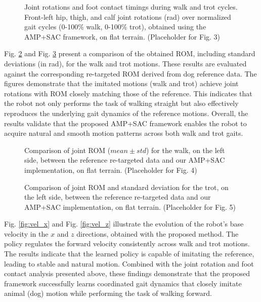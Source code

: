 \documentclass[letterpaper, 10pt, conference]{IEEEtran}
\begin{document}
\begin{figure}[ht]
    \centering
    \caption{Joint rotations and foot contact timings during walk and trot cycles. Front-left hip, thigh, and calf joint rotations (rad) over normalized gait cycles (0-100\% walk, 0-100\% trot), obtained using the AMP+SAC framework, on flat terrain. (Placeholder for Fig. 3)}
    \label{fig:joint_rotations}
\end{figure}

Fig. \ref{fig:rom_walk} and Fig. \ref{fig:rom_trot} present a comparison of the obtained ROM, including standard deviations (in rad), for the walk and trot motions. These results are evaluated against the corresponding re-targeted ROM derived from dog reference data. The figures demonstrate that the imitated motions (walk and trot) achieve joint rotations with ROM closely matching those of the reference. This indicates that the robot not only performs the task of walking straight but also effectively reproduces the underlying gait dynamics of the reference motions. Overall, the results validate that the proposed AMP+SAC framework enables the robot to acquire natural and smooth motion patterns across both walk and trot gaits.

\begin{figure}[ht]
    \centering
    \caption{Comparison of joint ROM ($mean\pm std$) for the walk, on the left side, between the reference re-targeted data and our AMP+SAC implementation, on flat terrain. (Placeholder for Fig. 4)}
    \label{fig:rom_walk}
\end{figure}

\begin{figure}[ht]
    \centering
    \caption{Comparison of joint ROM and standard deviation for the trot, on the left side, between the reference re-targeted data and our AMP+SAC implementation, on flat terrain. (Placeholder for Fig. 5)}
    \label{fig:rom_trot}
\end{figure}

Fig. \ref{fig:vel_x} and Fig. \ref{fig:vel_z} illustrate the evolution of the robot's base velocity in the $x$ and $z$ directions, obtained with the proposed method. The policy regulates the forward velocity consistently across walk and trot motions. The results indicate that the learned policy is capable of imitating the reference, leading to stable and natural motion. Combined with the joint rotation and foot contact analysis presented above, these findings demonstrate that the proposed framework successfully learns coordinated gait dynamics that closely imitate animal (dog) motion while performing the task of walking forward.
\end{document}
